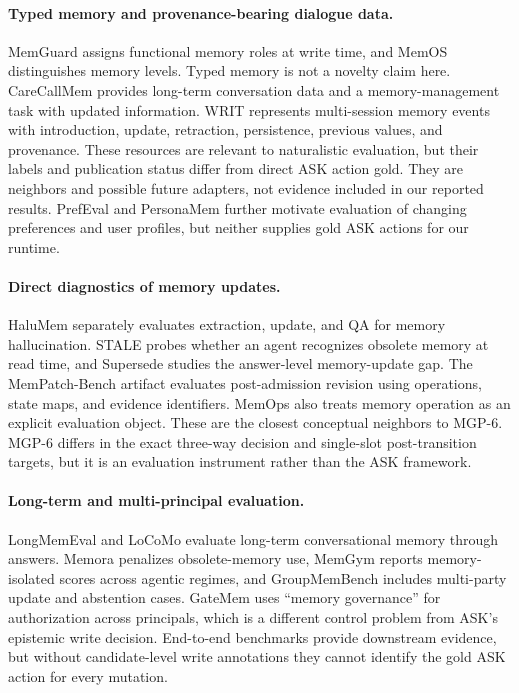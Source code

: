 \paragraph{Typed memory and provenance-bearing dialogue data.}
MemGuard \citep{ha2026memguard} assigns functional memory roles at write time,
and MemOS \citep{li2025memos} distinguishes memory levels. Typed memory is not a
novelty claim here. CareCallMem \citep{bae2022keep} provides long-term
conversation data and a memory-management task with updated information. WRIT
\citep{hendrickson2026writ} represents multi-session memory events with
introduction, update, retraction, persistence, previous values, and provenance.
These resources are relevant to naturalistic evaluation, but their labels and
publication status differ from direct ASK action gold. They are neighbors and
possible future adapters, not evidence included in our reported results.
PrefEval \citep{zhao2025prefeval} and PersonaMem
\citep{jiang2025personamem} further motivate evaluation of changing preferences
and user profiles, but neither supplies gold ASK actions for our runtime.

\paragraph{Direct diagnostics of memory updates.}
HaluMem \citep{halumem2025} separately evaluates extraction, update, and QA for
memory hallucination. STALE \citep{chao2026stale} probes whether an agent
recognizes obsolete memory at read time, and Supersede
\citep{patel2026supersede} studies the answer-level memory-update gap. The
MemPatch-Bench artifact \citep{zhu2026mempatch} evaluates post-admission
revision using operations, state maps, and evidence identifiers. MemOps
\citep{hao2026memops} also treats memory operation as an explicit evaluation
object. These are the closest conceptual neighbors to MGP-6. MGP-6 differs in
the exact three-way decision and single-slot post-transition targets, but it is
an evaluation instrument rather than the ASK framework.

\paragraph{Long-term and multi-principal evaluation.}
LongMemEval \citep{wu2025longmemeval} and LoCoMo
\citep{maharana2024locomo} evaluate long-term conversational memory through
answers. Memora \citep{uddin2026memora} penalizes obsolete-memory use, MemGym
\citep{xu2026memgym} reports memory-isolated scores across agentic regimes, and
GroupMemBench \citep{yang2026groupmembench} includes multi-party update and
abstention cases. GateMem \citep{ren2026gatemem} uses ``memory governance'' for
authorization across principals, which is a different control problem from
ASK's epistemic write decision. End-to-end benchmarks provide downstream
evidence, but without candidate-level write annotations they cannot identify
the gold ASK action for every mutation.

